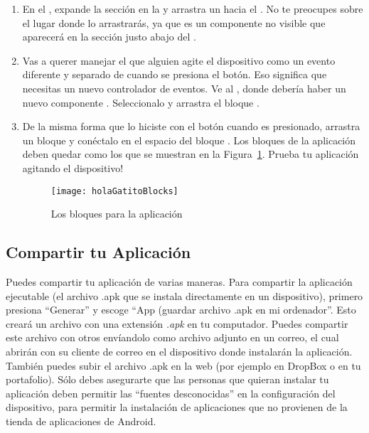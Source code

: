 \begin{enumerate}

\item En el \designer, expande la sección \sensors en la \palette y arrastra un  hacia el \viewer. No te preocupes sobre el lugar donde lo arrastrarás, ya que es un componente no visible que aparecerá en la sección justo abajo del \viewer.

\item Vas a querer manejar el que alguien agite el dispositivo como un evento diferente y separado de cuando se presiona el botón. Eso significa que necesitas un nuevo controlador de eventos. Ve al \blockEditor, donde debería haber un nuevo componente . Seleccionalo y arrastra el bloque .

\item De la misma forma que lo hiciste con el botón cuando es presionado, arrastra un bloque  y conéctalo en el espacio del bloque . Los bloques de la aplicación deben quedar como los que se muestran en la Figura~\ref{fig:holaGatitoBlocks}. Prueba tu aplicación agitando el dispositivo!

  \begin{figure}[H]
    \centering
    \texttt{[image: holaGatitoBlocks]}
    \caption{Los bloques para la aplicación }
    \label{fig:holaGatitoBlocks}
  \end{figure}

\end{enumerate}

\subsection*{Compartir tu Aplicación}

Puedes compartir tu aplicación de varias maneras. Para compartir la aplicación ejecutable (el archivo .apk que se instala directamente en un dispositivo), primero presiona ``Generar'' y escoge ``App (guardar archivo .apk en mi ordenador''. Esto creará un archivo con una extensión \emph{.apk} en tu computador. Puedes compartir este archivo con otros envíandolo como archivo adjunto en un correo, el cual abrirán con su cliente de correo en el dispositivo donde instalarán la aplicación. También puedes subir el archivo .apk en la web (por ejemplo en DropBox o en tu portafolio). Sólo debes asegurarte que las personas que quieran instalar tu aplicación deben permitir las ``fuentes desconocidas'' en la configuración del dispositivo, para permitir la instalación de aplicaciones que no provienen de la tienda de aplicaciones de Android.

